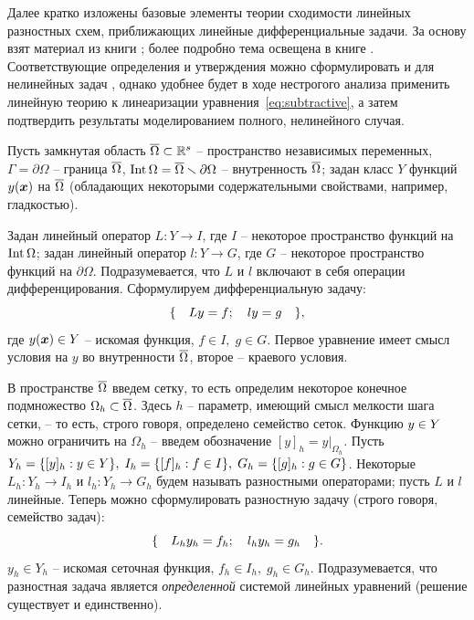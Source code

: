 Далее кратко изложены базовые элементы теории сходимости линейных разностных схем, приближающих линейные дифференциальные задачи. За основу взят материал из книги \cite[глава 10]{bahvalov_computational_methods}; более подробно тема освещена в книге \cite[глава IX]{kalitkin_computational_methods}. Соответствующие определения и утверждения можно сформулировать и для нелинейных задач \cite{kalitkin_computational_methods}, однако удобнее будет в ходе нестрогого анализа применить линейную теорию к линеаризации уравнения~\eqref{eq:subtractive}, а затем подтвердить результаты моделированием полного, нелинейного случая.

Пусть замкнутая область ${\overline{\Omega}} \subset {\mathbb{R}}^s$ -- пространство независимых переменных, $\Gamma = \partial \Omega$ -- граница ${\overline{\Omega}}$, $\operatorname{{Int}} \Omega = {\overline{\Omega}} \smallsetminus \partial \Omega$ -- внутренность ${\overline{\Omega}}$; задан класс $Y$ функций $y({\boldsymbol{x}})$ на ${\overline{\Omega}}$ (обладающих некоторыми содержательными свойствами, например, гладкостью).

Задан линейный оператор $L: Y \to I$, где $I$ -- некоторое пространство функций на $\operatorname{{Int}} \Omega$; задан линейный оператор $l: Y \to G$, где $G$ -- некоторое пространство функций на $\partial \Omega$. Подразумевается, что $L$ и $l$ включают в себя операции дифференцирования. Сформулируем дифференциальную задачу:
\begin{equation}
	\{ \quad Ly = f; \quad ly = g \quad \} {\text{,}}
	\label{eq:formal_differential}
\end{equation}
где $y({\boldsymbol{x}}) \in Y$ -- искомая функция, $f \in I, \; g \in G$. Первое уравнение имеет смысл условия на $y$ во внутренности ${\overline{\Omega}}$, второе -- краевого условия.

В пространстве ${\overline{\Omega}}$ введем сетку, то есть определим некоторое конечное подмножество $\Omega_h \subset {\overline{\Omega}}$. Здесь $h$ -- параметр, имеющий смысл мелкости шага сетки, -- то есть, строго говоря, определено семейство сеток. Функцию $y \hm \in Y$ можно ограничить на $\Omega_h$ -- введем обозначение $[y]_h = y|_{\Omega_h}$. Пусть $Y_h \hm = \{[y]_h: y \in Y\}, \; I_h = \{[f]_h: f \in I\}, \; G_h = \{[g]_h: g \in G\}$. Некоторые $L_h: Y_h \to I_h$ и $l_h: Y_h \to G_h$ будем называть разностными операторами; пусть $L$ и $l$ линейные. Теперь можно сформулировать разностную задачу (строго говоря, семейство задач):
\begin{equation}
	\{ \quad L_h y_h = f_h; \quad l_h y_h = g_h \quad \} {\text{.}}
	\label{eq:formal_subtractive}
\end{equation}
$y_h \in Y_h$ -- искомая сеточная функция, $f_h \in I_h, \; g_h \in G_h$. Подразумевается, что разностная задача является \emph{определенной} системой линейных уравнений (решение существует и единственно).

